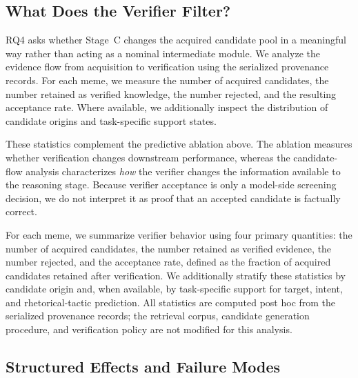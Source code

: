 \subsection{What Does the Verifier Filter?}
\label{sec:analysis:verifier_flow}

RQ4 asks whether Stage~C changes the acquired candidate pool in a meaningful
way rather than acting as a nominal intermediate module.
We analyze the evidence flow from acquisition to verification using the
serialized provenance records.
For each meme, we measure the number of acquired candidates, the number
retained as verified knowledge, the number rejected, and the resulting
acceptance rate.
Where available, we additionally inspect the distribution of candidate
origins and task-specific support states.

These statistics complement the predictive ablation above.
The ablation measures whether verification changes downstream performance,
whereas the candidate-flow analysis characterizes \emph{how} the verifier
changes the information available to the reasoning stage.
Because verifier acceptance is only a model-side screening decision, we do
not interpret it as proof that an accepted candidate is factually correct.

For each meme, we summarize verifier behavior using four primary quantities:
the number of acquired candidates, the number retained as verified evidence,
the number rejected, and the acceptance rate, defined as the fraction of
acquired candidates retained after verification.
We additionally stratify these statistics by candidate origin and, when
available, by task-specific support for target, intent, and rhetorical-tactic
prediction.
All statistics are computed post hoc from the serialized provenance records;
the retrieval corpus, candidate generation procedure, and verification policy
are not modified for this analysis.

%
%
%

\subsection{Structured Effects and Failure Modes}
\label{sec:analysis:structured_errors}
\label{sec:analysis:evidence}

